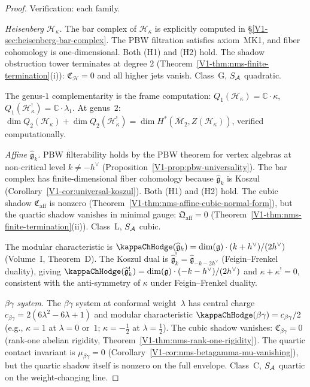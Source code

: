 \begin{proof}
Verification: each family.

\emph{Heisenberg $\mathcal{H}_\kappa$.}
The bar complex of $\mathcal{H}_\kappa$ is explicitly
computed in \S\ref{V1-sec:heisenberg-bar-complex}. The
PBW filtration satisfies axiom~MK1, and fiber
cohomology is one-dimensional. Both (H1) and (H2) hold.
The shadow obstruction tower terminates at degree $2$
(Theorem~\ref{V1-thm:nms-finite-termination}(i)):
$\mathfrak{C}_{\mathcal{H}} = 0$ and all higher jets vanish.
Class~G, $S_{\mathcal{A}}$ quadratic.

The genus-$1$ complementarity is the frame computation:
$Q_1(\mathcal{H}_\kappa) = \mathbb{C} \cdot \kappa$,
$Q_1(\mathcal{H}_\kappa^!) = \mathbb{C} \cdot \lambda_1$.
At genus~$2$:
$\dim Q_2(\mathcal{H}_\kappa) + \dim Q_2(\mathcal{H}_\kappa^!)
= \dim H^*(\overline{\mathcal{M}}_2, Z(\mathcal{H}_\kappa))$,
verified computationally.

\emph{Affine $\widehat{\mathfrak{g}}_k$.}
PBW filterability holds by the PBW theorem for vertex algebras
at non-critical level $k \ne -h^{\vee}$
(Proposition~\ref{V1-prop:pbw-universality}).
The bar complex has finite-dimensional fiber cohomology
because $\widehat{\mathfrak{g}}_k$ is Koszul
(Corollary~\ref{V1-cor:universal-koszul}).
Both (H1) and (H2) hold.
The cubic shadow $\mathfrak{C}_{\mathrm{aff}}$ is nonzero
(Theorem~\ref{V1-thm:nms-affine-cubic-normal-form}), but the
quartic shadow vanishes in minimal gauge:
$\mathfrak{Q}_{\mathrm{aff}} = 0$
(Theorem~\ref{V1-thm:nms-finite-termination}(ii)).
Class~L, $S_{\mathcal{A}}$ cubic.

The modular characteristic is
$\kappaChHodge(\widehat{\mathfrak{g}}_k) = \dim(\mathfrak{g})\cdot(k+h^\vee)/(2h^\vee)$
(Volume~I, Theorem~D).
The Koszul dual is
$\widehat{\mathfrak{g}}_k^! =
\widehat{\mathfrak{g}}_{-k-2h^{\vee}}$
(Feigin--Frenkel duality), giving
$\kappaChHodge(\widehat{\mathfrak{g}}_k^!)
= \dim(\mathfrak{g}) \cdot (-k - h^{\vee})/(2h^{\vee})$
and $\kappa + \kappa^! = 0$, consistent with the
anti-symmetry of $\kappa$ under Feigin--Frenkel duality.

\emph{$\beta\gamma$ system.}
The $\beta\gamma$ system at conformal weight~$\lambda$ has central charge
$c_{\beta\gamma} = 2(6\lambda^2 - 6\lambda + 1)$ and
modular characteristic $\kappaChHodge(\beta\gamma) = c_{\beta\gamma}/2$
(e.g., $\kappa = 1$ at $\lambda = 0$ or~$1$; $\kappa = -\tfrac{1}{2}$ at $\lambda = \tfrac{1}{2}$).
The cubic shadow vanishes: $\mathfrak{C}_{\beta\gamma} = 0$
(rank-one abelian rigidity,
Theorem~\ref{V1-thm:nms-rank-one-rigidity}).
The quartic contact invariant is
$\mu_{\beta\gamma} = 0$
(Corollary~\ref*{V1-cor:nms-betagamma-mu-vanishing}), but the
quartic shadow itself is nonzero on the full envelope.
Class~C, $S_{\mathcal{A}}$ quartic on the weight-changing line.


\end{proof}
